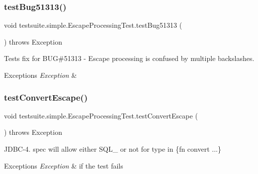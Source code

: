 \subsubsection{\texorpdfstring{test\+Bug51313()}{testBug51313()}}
{\footnotesize\ttfamily void testsuite.\+simple.\+Escape\+Processing\+Test.\+test\+Bug51313 (\begin{DoxyParamCaption}{ }\end{DoxyParamCaption}) throws Exception}

Tests fix for B\+UG\#51313 -\/ Escape processing is confused by multiple backslashes.


\begin{DoxyExceptions}{Exceptions}
{\em Exception} & \\
\hline
\end{DoxyExceptions}
\mbox{\label{classtestsuite_1_1simple_1_1_escape_processing_test_a72337dad91eb44391ac9f34d7531b177}} 
\subsubsection{\texorpdfstring{test\+Convert\+Escape()}{testConvertEscape()}}
{\footnotesize\ttfamily void testsuite.\+simple.\+Escape\+Processing\+Test.\+test\+Convert\+Escape (\begin{DoxyParamCaption}{ }\end{DoxyParamCaption}) throws Exception}

J\+D\+B\+C-\/4. spec will allow either S\+Q\+L\+\_\+ or not for type in \{fn convert ...\}


\begin{DoxyExceptions}{Exceptions}
{\em Exception} & if the test fails \\
\hline
\end{DoxyExceptions}
\mbox{\label{classtestsuite_1_1simple_1_1_escape_processing_test_a89dd9212c87f06506d7442cafd9ce935}} 
